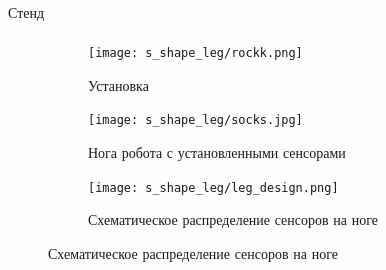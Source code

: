 \begin{frame}[t]{Стенд}
    \framesubtitle{}
    \begin{figure}[H]
        \begin{subfigure}[t]{0.33\textwidth}
            \centering\texttt{[image: s\_shape\_leg/rockk.png]}
            \caption*{Установка}
        \end{subfigure}
        \begin{subfigure}[t]{0.33\textwidth}
            \centering\texttt{[image: s\_shape\_leg/socks.jpg]}
            \caption*{Нога робота с установленными сенсорами}
        \end{subfigure}
        \begin{subfigure}[t]{0.33\textwidth}
            \centering\texttt{[image: s\_shape\_leg/leg\_design.png]}
            \caption*{Схематическое распределение сенсоров на ноге}
        \end{subfigure}
    \end{figure}
\end{frame}



